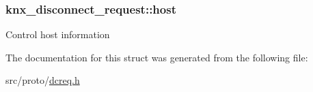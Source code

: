 \subsubsection[{\texorpdfstring{host}{host}}]{ knx\+\_\+disconnect\+\_\+request\+::host}\hypertarget{structknx__disconnect__request_a3eba6f0a52bec029e5bea9ecab2fe2a3}{}\label{structknx__disconnect__request_a3eba6f0a52bec029e5bea9ecab2fe2a3}
Control host information 

The documentation for this struct was generated from the following file\+:\begin{DoxyCompactItemize}
\item 
src/proto/\hyperlink{dcreq_8h}{dcreq.\+h}\end{DoxyCompactItemize}
